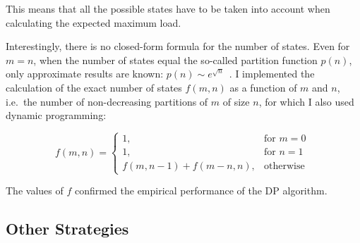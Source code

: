 This means that all the possible states have to be taken into account when calculating the expected maximum load.



Interestingly, there is no closed-form formula for the number of states. Even for $m=n$, when the number of states equal the so-called partition function $p(n)$, only approximate results are known: $p(n) \sim e^{\sqrt{n}}$~\cite{hardy1918partitionfunction}. I implemented the calculation of the exact number of states $f(m, n)$ as a function of $m$ and $n$, i.e.\ the number of non-decreasing partitions of $m$ of size $n$, for which I also used dynamic programming:

\begin{equation} \label{eq: numberofpartitions}
    f(m, n) = \begin{cases}
        1, & \text{for } m=0\\
        1, & \text{for } n=1\\
        f(m,n-1)+f(m-n,n), & \text{otherwise }
    \end{cases}
\end{equation}




The values of $f$ confirmed the empirical performance of the DP algorithm.

\subsection{Other Strategies}

